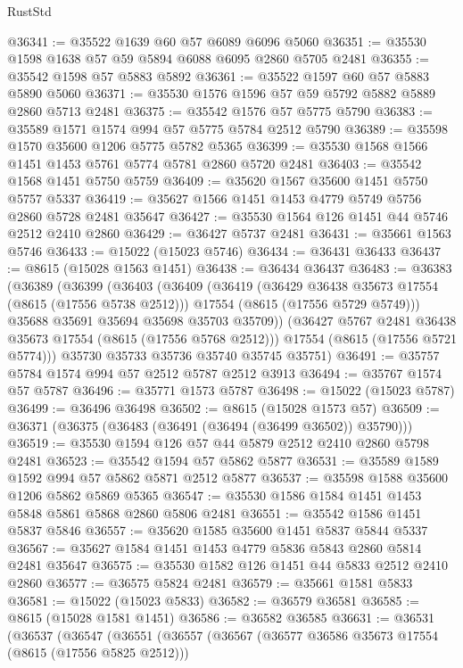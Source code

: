 \begin{lexlean}{RustStd}
\begin{coremodule}
@36341 := @35522 @1639 @60 @57 @6089 @6096 @5060
@36351 := @35530 @1598 @1638 @57 @59 @5894 @6088 @6095 @2860 @5705 @2481
@36355 := @35542 @1598 @57 @5883 @5892
@36361 := @35522 @1597 @60 @57 @5883 @5890 @5060
@36371 := @35530 @1576 @1596 @57 @59 @5792 @5882 @5889 @2860 @5713 @2481
@36375 := @35542 @1576 @57 @5775 @5790
@36383 := @35589 @1571 @1574 @994 @57 @5775 @5784 @2512 @5790
@36389 := @35598 @1570 @35600 @1206 @5775 @5782 @5365
@36399 := @35530 @1568 @1566 @1451 @1453 @5761 @5774 @5781 @2860 @5720 @2481
@36403 := @35542 @1568 @1451 @5750 @5759
@36409 := @35620 @1567 @35600 @1451 @5750 @5757 @5337
@36419 := @35627 @1566 @1451 @1453 @4779 @5749 @5756 @2860 @5728 @2481 @35647
@36427 := @35530 @1564 @126 @1451 @44 @5746 @2512 @2410 @2860
@36429 := @36427 @5737 @2481
@36431 := @35661 @1563 @5746
@36433 := @15022 (@15023 @5746)
@36434 := @36431 @36433
@36437 := @8615 (@15028 @1563 @1451)
@36438 := @36434 @36437
@36483 := @36383
    (@36389
      (@36399
        (@36403
          (@36409
            (@36419
              (@36429 @36438 @35673 @17554 (@8615 (@17556 @5738 @2512)))
              @17554
              (@8615 (@17556 @5729 @5749)))
            @35688
            @35691
            @35694
            @35698
            @35703
            @35709))
        (@36427 @5767 @2481 @36438 @35673 @17554 (@8615 (@17556 @5768 @2512)))
        @17554
        (@8615 (@17556 @5721 @5774)))
      @35730
      @35733
      @35736
      @35740
      @35745
      @35751)
@36491 := @35757 @5784 @1574 @994 @57 @2512 @5787 @2512 @3913
@36494 := @35767 @1574 @57 @5787
@36496 := @35771 @1573 @5787
@36498 := @15022 (@15023 @5787)
@36499 := @36496 @36498
@36502 := @8615 (@15028 @1573 @57)
@36509 := @36371 (@36375 (@36483 (@36491 (@36494 (@36499 @36502)) @35790)))
@36519 := @35530 @1594 @126 @57 @44 @5879 @2512 @2410 @2860 @5798 @2481
@36523 := @35542 @1594 @57 @5862 @5877
@36531 := @35589 @1589 @1592 @994 @57 @5862 @5871 @2512 @5877
@36537 := @35598 @1588 @35600 @1206 @5862 @5869 @5365
@36547 := @35530 @1586 @1584 @1451 @1453 @5848 @5861 @5868 @2860 @5806 @2481
@36551 := @35542 @1586 @1451 @5837 @5846
@36557 := @35620 @1585 @35600 @1451 @5837 @5844 @5337
@36567 := @35627 @1584 @1451 @1453 @4779 @5836 @5843 @2860 @5814 @2481 @35647
@36575 := @35530 @1582 @126 @1451 @44 @5833 @2512 @2410 @2860
@36577 := @36575 @5824 @2481
@36579 := @35661 @1581 @5833
@36581 := @15022 (@15023 @5833)
@36582 := @36579 @36581
@36585 := @8615 (@15028 @1581 @1451)
@36586 := @36582 @36585
@36631 := @36531
    (@36537
      (@36547
        (@36551
          (@36557
            (@36567
              (@36577 @36586 @35673 @17554 (@8615 (@17556 @5825 @2512)))

\end{coremodule}
\end{lexlean}
